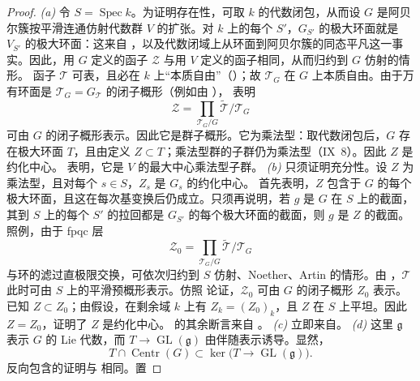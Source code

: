 \begin{proof}
\emph{(a)} 令 \(S=\operatorname{Spec}k\)。为证明存在性，可取 \(k\) 的代数闭包，从而设 \(G\) 是阿贝尔簇按平滑连通仿射代数群 \(V\) 的扩张。对 \(k\) 上的每个 \(S'\)，\(G_{S'}\) 的极大环面就是 \(V_{S'}\) 的极大环面：这来自 ，以及代数闭域上从环面到阿贝尔簇的同态平凡这一事实。因此，用 \(G\) 定义的函子 \(\mathcal Z\) 与用 \(V\) 定义的函子相同，从而归约到 \(G\) 仿射的情形。
函子 \(\mathcal T\) 可表，且必在 \(k\) 上“本质自由”（）；故 \(\mathcal T_G\) 在 \(G\) 上本质自由。由于万有环面是 \(\mathcal T_G=G_{\mathcal T}\) 的闭子概形（例如由 ）， 表明
\[
  \mathcal Z=
  \prod_{\mathcal T_G/G}
  \widetilde{\mathcal T}/\mathcal T_G
\]
可由 \(G\) 的闭子概形表示。因此它是群子概形。它为乘法型：取代数闭包后，\(G\) 存在极大环面 \(T\)，且由定义 \(Z\subset T\)；乘法型群的子群仍为乘法型（IX~8）。因此 \(Z\) 是约化中心。 表明，它是 \(V\) 的最大中心乘法型子群。
\emph{(b)} 只须证明充分性。设 \(Z\) 为乘法型，且对每个 \(s\in S\)，\(Z_s\) 是 \(G_s\) 的约化中心。 首先表明，\(Z\) 包含于 \(G\) 的每个极大环面，且这在每次基变换后仍成立。只须再说明，若 \(g\) 是 \(G\) 在 \(S\) 上的截面，其到 \(S\) 上的每个 \(S'\) 的拉回都是 \(G_{S'}\) 的每个极大环面的截面，则 \(g\) 是 \(Z\) 的截面。
照例，由于 fpqc 层
\[
  \mathcal Z_0=
  \prod_{\mathcal T_G/G}
  \widetilde{\mathcal T}/\mathcal T_G
\]
与环的滤过直极限交换，可依次归约到 \(S\) 仿射、Noether、Artin 的情形。由 ，\(\mathcal T\) 此时可由 \(S\) 上的平滑预概形表示。仿照\textup{} 论证，\(\mathcal Z_0\) 可由 \(G\) 的闭子概形 \(Z_0\) 表示。已知 \(Z\subset Z_0\)；由假设，在剩余域 \(k\) 上有 \(Z_k=(Z_0)_k\)，且 \(Z\) 在 \(S\) 上平坦。因此 \(Z=Z_0\)，证明了 \(Z\) 是约化中心。\textup{} 的其余断言来自 。
\emph{(c)} 立即来自\textup{}。
\emph{(d)} 这里 \(\mathfrak g\) 表示 \(G\) 的 Lie 代数，而 \(T\to\operatorname{GL}(\mathfrak g)\) 由伴随表示诱导。显然，
\[
  T\cap\operatorname{Centr}(G)
  \subset
  \ker\bigl(T\longrightarrow\operatorname{GL}(\mathfrak g)\bigr).
\]
反向包含的证明与  相同。置

\end{proof}
